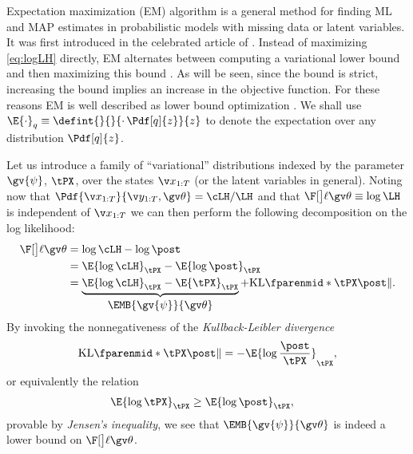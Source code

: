 
Expectation maximization (EM) algorithm is a general
method for finding ML and MAP estimates in probabilistic models with missing data or
latent variables. It was first introduced in
the celebrated article of \textcite{Dempster1977}. Instead of maximizing
\eqref{eq:logLH} directly, EM alternates between computing a variational lower bound and then maximizing this bound
\parencite{Bishop2006,barber2012bayesian}. As will be seen, since the bound is strict, increasing the bound implies
an increase in the objective function. For these reasons EM is well described as lower bound optimization \parencite{Minka1998}.
We shall use $\E{\cdot}_{q}\equiv\defint{}{}{\cdot\,\Pdf[q]{z}}{z}$ to denote the expectation
over any distribution $\Pdf[q]{z}$.

Let us introduce a family of ``variational'' distributions 
indexed by the parameter $\gv{\psi}$, $\tPX$, over the states $\X$ (or the latent variables in general).
Noting now that $\Pdf{\X}{\Y,\Th}=\cLH/\LH$ and that $\lLH\equiv\log\LH$ is independent of $\X$ we can then perform the
following decomposition on the log likelihood:
\begin{align}
	\lLH &= \log\cLH - \log\post \nonumber\\
	&= \E{\log\cLH}_{\tPX} - \E{\log\post}_{\tPX} \nonumber\\ 
	&= \underbrace{\E{\log\cLH}_{\tPX} - \E{\tPX}_{\tPX}}_{\displaystyle \EMB{\gv{\psi}}{\Th}}+\KL{\tPX}{\post}. 
	\label{eq:lLH_decomp}
\end{align}
By invoking the nonnegativeness of
the \emph{Kullback-Leibler divergence}
\begin{align}
		\KL{\tPX}{\post} = -\E{\log{\frac{\post}{\tPX}}}_{\tPX},  
\end{align}
or equivalently the relation
\begin{align}
	\E{\log\tPX}_{\tPX} &\geq \E{\log\post}_{\tPX},	
\end{align}
provable by \emph{Jensen's inequality}, 
we see that $\EMB{\gv{\psi}}{\Th}$ is indeed a lower bound on $\lLH$. 


